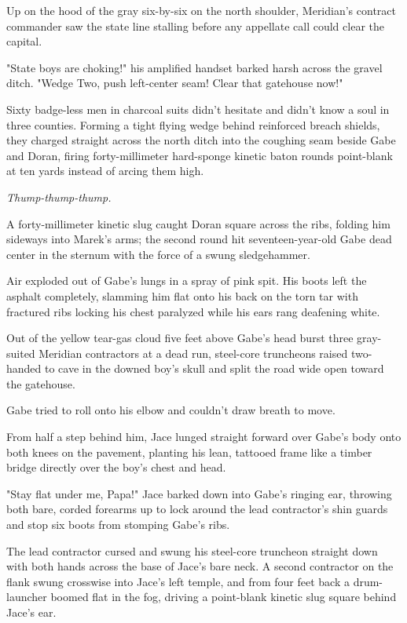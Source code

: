 Up on the hood of the gray six-by-six on the north shoulder, Meridian's contract commander saw the state line stalling before any appellate call could clear the capital.

"State boys are choking!" his amplified handset barked harsh across the gravel ditch. "Wedge Two, push left-center seam! Clear that gatehouse now!"

Sixty badge-less men in charcoal suits didn't hesitate and didn't know a soul in three counties. Forming a tight flying wedge behind reinforced breach shields, they charged straight across the north ditch into the coughing seam beside Gabe and Doran, firing forty-millimeter hard-sponge kinetic baton rounds point-blank at ten yards instead of arcing them high.

\textit{Thump-thump-thump.}

A forty-millimeter kinetic slug caught Doran square across the ribs, folding him sideways into Marek's arms; the second round hit seventeen-year-old Gabe dead center in the sternum with the force of a swung sledgehammer.

Air exploded out of Gabe's lungs in a spray of pink spit. His boots left the asphalt completely, slamming him flat onto his back on the torn tar with fractured ribs locking his chest paralyzed while his ears rang deafening white.

Out of the yellow tear-gas cloud five feet above Gabe's head burst three gray-suited Meridian contractors at a dead run, steel-core truncheons raised two-handed to cave in the downed boy's skull and split the road wide open toward the gatehouse.

Gabe tried to roll onto his elbow and couldn't draw breath to move.

From half a step behind him, Jace lunged straight forward over Gabe's body onto both knees on the pavement, planting his lean, tattooed frame like a timber bridge directly over the boy's chest and head.

"Stay flat under me, Papa!" Jace barked down into Gabe's ringing ear, throwing both bare, corded forearms up to lock around the lead contractor's shin guards and stop six boots from stomping Gabe's ribs.

The lead contractor cursed and swung his steel-core truncheon straight down with both hands across the base of Jace's bare neck. A second contractor on the flank swung crosswise into Jace's left temple, and from four feet back a drum-launcher boomed flat in the fog, driving a point-blank kinetic slug square behind Jace's ear.

